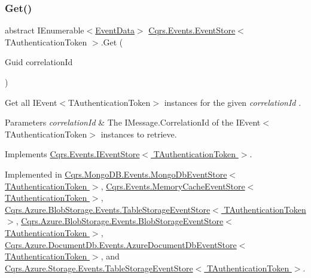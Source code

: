 \subsubsection{\texorpdfstring{Get()}{Get()}\hspace{0.1cm}{\footnotesize\ttfamily [2/2]}}
{\footnotesize\ttfamily abstract I\+Enumerable$<$\hyperlink{classCqrs_1_1Events_1_1EventData}{Event\+Data}$>$ \hyperlink{classCqrs_1_1Events_1_1EventStore}{Cqrs.\+Events.\+Event\+Store}$<$ T\+Authentication\+Token $>$.Get (\begin{DoxyParamCaption}\item[{Guid}]{correlation\+Id }\end{DoxyParamCaption})\hspace{0.3cm}{\ttfamily [pure virtual]}}



Get all I\+Event$<$\+T\+Authentication\+Token$>$ instances for the given {\itshape correlation\+Id} . 


\begin{DoxyParams}{Parameters}
{\em correlation\+Id} & The I\+Message.\+Correlation\+Id of the I\+Event$<$\+T\+Authentication\+Token$>$ instances to retrieve.\\
\hline
\end{DoxyParams}


Implements \hyperlink{interfaceCqrs_1_1Events_1_1IEventStore_af398bb6768fa661ad97a9fa9ecfbd9fb_af398bb6768fa661ad97a9fa9ecfbd9fb}{Cqrs.\+Events.\+I\+Event\+Store$<$ T\+Authentication\+Token $>$}.



Implemented in \hyperlink{classCqrs_1_1MongoDB_1_1Events_1_1MongoDbEventStore_ac886ca0a57ad86cb99ef0a3767db9280_ac886ca0a57ad86cb99ef0a3767db9280}{Cqrs.\+Mongo\+D\+B.\+Events.\+Mongo\+Db\+Event\+Store$<$ T\+Authentication\+Token $>$}, \hyperlink{classCqrs_1_1Events_1_1MemoryCacheEventStore_a2a93a3f10423f608527fbc41a7ce8cef_a2a93a3f10423f608527fbc41a7ce8cef}{Cqrs.\+Events.\+Memory\+Cache\+Event\+Store$<$ T\+Authentication\+Token $>$}, \hyperlink{classCqrs_1_1Azure_1_1BlobStorage_1_1Events_1_1TableStorageEventStore_a9b952a9257dc6f458b98eba87684412e_a9b952a9257dc6f458b98eba87684412e}{Cqrs.\+Azure.\+Blob\+Storage.\+Events.\+Table\+Storage\+Event\+Store$<$ T\+Authentication\+Token $>$}, \hyperlink{classCqrs_1_1Azure_1_1BlobStorage_1_1Events_1_1BlobStorageEventStore_a660c786205693ee34a11e205c6d136ad_a660c786205693ee34a11e205c6d136ad}{Cqrs.\+Azure.\+Blob\+Storage.\+Events.\+Blob\+Storage\+Event\+Store$<$ T\+Authentication\+Token $>$}, \hyperlink{classCqrs_1_1Azure_1_1DocumentDb_1_1Events_1_1AzureDocumentDbEventStore_ac59ce599b768ce047869b8ac135f4e22_ac59ce599b768ce047869b8ac135f4e22}{Cqrs.\+Azure.\+Document\+Db.\+Events.\+Azure\+Document\+Db\+Event\+Store$<$ T\+Authentication\+Token $>$}, and \hyperlink{classCqrs_1_1Azure_1_1Storage_1_1Events_1_1TableStorageEventStore_a1b436bbb111b14b85ee6ba7f90fb1a35_a1b436bbb111b14b85ee6ba7f90fb1a35}{Cqrs.\+Azure.\+Storage.\+Events.\+Table\+Storage\+Event\+Store$<$ T\+Authentication\+Token $>$}.

